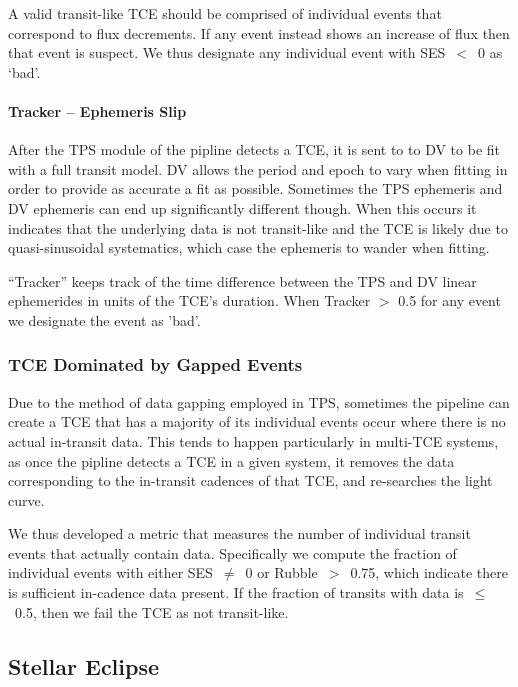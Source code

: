 A valid transit-like TCE should be comprised of individual events that correspond to flux decrements. If any event instead shows an increase of flux then that event is suspect. We thus designate any individual event with SES~$<$~0 as `bad'.


\paragraph{Tracker -- Ephemeris Slip}

After the TPS module of the \kepler{} pipline detects a TCE, it is sent to to DV to be fit with a full transit model. DV allows the period and epoch to vary when fitting in order to provide as accurate a fit as possible. Sometimes the TPS ephemeris and DV ephemeris can end up significantly different though. When this occurs it indicates that the underlying data is not transit-like and the TCE is likely due to quasi-sinusoidal systematics, which case the ephemeris to wander when fitting.

``Tracker'' keeps track of the time difference between the TPS and DV linear ephemerides in units of the TCE's duration. When Tracker $>$ 0.5 for any event we designate the event as 'bad'.


\subsubsection{TCE Dominated by Gapped Events}

Due to the method of data gapping employed in TPS, sometimes the \kepler{} pipeline can create a TCE that has a majority of its individual events occur where there is no actual in-transit data. This tends to happen particularly in multi-TCE systems, as once the \kepler{} pipline detects a TCE in a given system, it removes the data corresponding to the in-transit cadences of that TCE, and re-searches the light curve. 

We thus developed a metric that measures the number of individual transit events that actually contain data. Specifically we compute the fraction of individual events with either SES~$\ne$~0 or Rubble~$>$~0.75, which indicate there is sufficient in-cadence data present. If the fraction of transits with data is~$\le$~0.5, then we fail the TCE as not transit-like.





\subsection{Stellar Eclipse}
\label{sigsecsec}

